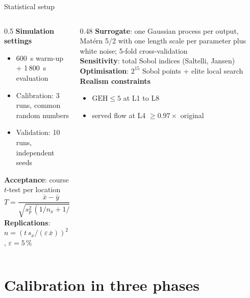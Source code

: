 \documentclass[aspectratio=169,10pt]{beamer}
\begin{document}
\begin{frame}{Statistical setup}
\begin{columns}[T]
\begin{column}{0.5\textwidth}
\small
\textbf{Simulation settings}
\begin{itemize}
  \item 600~s warm-up + 1\,800~s evaluation
  \item Calibration: 3 runs, common random numbers
  \item Validation: 10 runs, independent seeds
\end{itemize}
\vspace{4pt}
\textbf{Acceptance}: course $t$-test per location
\[
T = \frac{\bar x - \bar y}{\sqrt{s_p^2\,(1/n_x + 1/n_y)}},\quad |T| < 2.101
\]
\textbf{Replications}: $n = \left(t\,s_x/(\varepsilon\,\bar x)\right)^2$, $\varepsilon = 5\,\%$
\end{column}
\begin{column}{0.48\textwidth}
\small
\textbf{Surrogate}: one Gaussian process per output, Mat\'ern 5/2 with one length scale per
parameter plus white noise; 5-fold cross-validation\\[4pt]
\textbf{Sensitivity}: total Sobol indices (Saltelli, Jansen)\\[4pt]
\textbf{Optimisation}: $2^{15}$ Sobol points + elite local search\\[4pt]
\textbf{Realism constraints}
\begin{itemize}
  \item $\mathrm{GEH} \le 5$ at L1 to L8
  \item served flow at L4 $\ge 0.97\times$ original
\end{itemize}
\end{column}
\end{columns}
\end{frame}

\section{Calibration in three phases}
\end{document}
